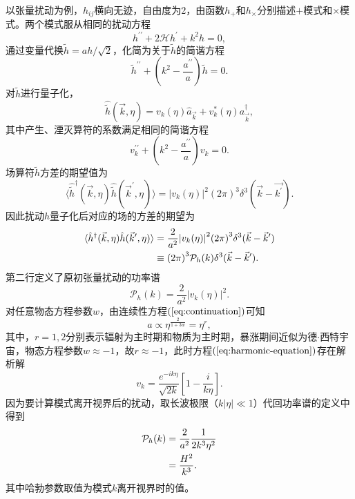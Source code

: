 以张量扰动为例，$h_{ij}$横向无迹，自由度为2，由函数$h_{+}$和$h_{\times}$分别描述$+$模式和$\times$模式。两个模式服从相同的扰动方程
\begin{equation}
  \label{eq:tensor-perturbation-equation}
  h^{\prime\prime}+ 2\mathcal{H}h^\prime+k^2h = 0,
\end{equation}
通过变量代换$\tilde{h}=ah/\sqrt{2}$，化简为关于$\tilde{h}$的简谐方程
\begin{equation}
  \tilde{h}^{\prime\prime}+(k^2-\frac{a^{\prime\prime}}{a})\tilde{h} =0. 
\end{equation}
对$\tilde{h}$进行量子化，
\begin{equation}
  \hat{\tilde{h}}(\vec{k},\eta)=v_k(\eta)\hat{a}_{\vec{k}}+v^{*}_k(
  \eta)a^{\dagger}_{\vec{k}},
\end{equation}
其中产生、湮灭算符的系数满足相同的简谐方程
\begin{equation}
  \label{eq:harmonic-equation}
  v_k^{\prime\prime}+(k^2-\frac{a^{\prime\prime}}{a})v_k =0. 
\end{equation}
场算符$\tilde{h}$方差的期望值为
\begin{equation}
  \langle \hat{\tilde{h}}^{\dagger}(\vec{k},
  \eta)\hat{\tilde{h}}(\vec{k}^{\prime},\eta)\rangle={\lvert
  v_k(\eta)\rvert}^2 {\left(2\pi
\right)}^3\delta^{3}(\vec{k}-\vec{k^\prime}).
\end{equation}
因此扰动$h$量子化后对应的场的方差的期望为
\begin{align}
  \langle \hat{h}^{\dagger}(\vec{k},\eta)\hat{h}(\vec{k}^{\prime},\eta) \rangle
  &= \frac{2}{a^2}{\lvert
  v_k(\eta)\rvert}^2{\left(2\pi\right)}^3\delta^3(\vec{k}-\vec{k}^{\prime})
  \notag
  \\
  &\equiv {\left(2\pi\right)}^3 \mathcal{P}_h(k)\delta^3(\vec{k}-\vec{k}^\prime).
\end{align}
第二行定义了原初张量扰动的功率谱
\begin{equation}
  \label{eq:tensor-primodial-pertubation} 
  \mathcal{P}_h(k) = \frac{2}{a^2}{\lvert v_k(\eta)\rvert}^2.
\end{equation}
对任意物态方程参数$w$，由连续性方程$(\ref{eq:continuation})$可知
\begin{equation}
  a \propto \eta^{\frac{2}{1+3w}} = \eta^{r},
\end{equation}
其中，$r=1,2$分别表示辐射为主时期和物质为主时期，暴涨期间近似为德$\cdot$西特宇宙，物态方程参数$w\approx
-1$，故$r\approx -1$，此时方程$(\ref{eq:harmonic-equation})$存在解析解
\begin{equation}
  \label{eq:solution-for-harmonic-equation}
  v_k = \frac{e^{-ik\eta}}{\sqrt{2k}}{\left[1-\frac{i}{k\eta}\right]}.
\end{equation}
因为要计算模式离开视界后的扰动，取长波极限（$k\lvert \eta\rvert \ll
1$）代回功率谱的定义中得到
\begin{align}
  \label{eq:tensor-power-spectrum}
  \mathcal{P}_h(k)&= \frac{2}{a^2}\frac{1}{2k^3\eta^2} \notag\\
        &= \frac{H^2}{k^3}.
\end{align}
其中哈勃参数取值为模式$k$离开视界时的值。

